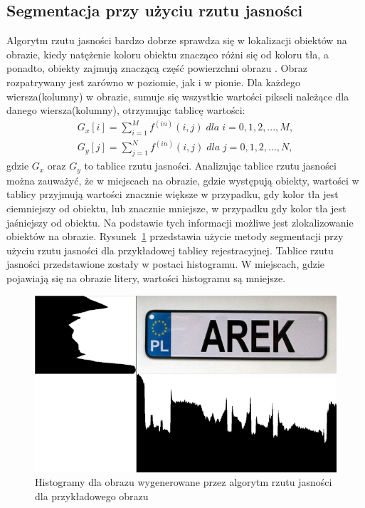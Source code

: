 \subsection{Segmentacja przy użyciu rzutu jasności} \label{ssec:rzut_jasnosci}
Algorytm rzutu jasności bardzo dobrze sprawdza się w lokalizacji obiektów na obrazie, kiedy natężenie koloru obiektu znacząco różni się od koloru tła, a ponadto, obiekty zajmują znaczącą część powierzchni obrazu \cite{barroso97}. Obraz rozpatrywany jest zarówno w poziomie, jak i w pionie. Dla każdego wiersza(kolumny) w obrazie, sumuje się wszystkie wartości pikseli należące dla danego wiersza(kolumny), otrzymując tablicę wartości:
\begin{gather*}
  G_x[i] = \sum\limits_{i=1}^M f^{(in)}(i, j) \; dla \; i = 0,1,2,...,M, \\
  G_y[j] = \sum\limits_{j=1}^N f^{(in)}(i, j) \; dla \; j = 0,1,2,...,N,
\end{gather*} gdzie $G_x$ oraz $G_y$ to tablice rzutu jasności. Analizując tablice rzutu jasności można zauważyć, że w miejscach na obrazie, gdzie występują obiekty, wartości w tablicy przyjmują wartości znacznie większe w przypadku, gdy kolor tła jest ciemniejszy od obiektu, lub znacznie mniejsze, w przypadku gdy kolor tła jest jaśniejszy od obiektu. Na podstawie tych informacji możliwe jest zlokalizowanie obiektów na obrazie. Rysunek~\ref{fig:rzut_jasnosci} przedstawia użycie metody segmentacji przy użyciu rzutu jasności dla przykładowej tablicy rejestracyjnej. Tablice rzutu jasności przedstawione zostały w postaci histogramu. W miejscach, gdzie pojawiają się na obrazie litery, wartości histogramu są mniejsze.

\begin{figure}
  \centering
  \includegraphics[width=15cm]{img/rzut-jasnosci}
  \caption{Histogramy dla obrazu wygenerowane przez algorytm rzutu jasności dla przykładowego obrazu}
  \label{fig:rzut_jasnosci}
\end{figure}

